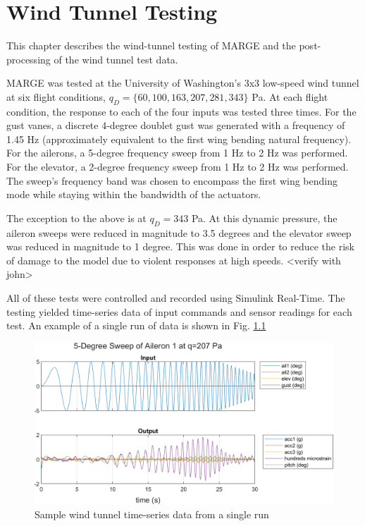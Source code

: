 \chapter{Wind Tunnel Testing}
\label{ch:windTunnel}
\label{sec:wtDAQ}

This chapter describes the wind-tunnel testing of MARGE and the post-processing of the wind tunnel test data.

MARGE was tested at the University of Washington's 3x3 low-speed wind tunnel at six flight conditions, $q_D=\{60,100,163,207,281,343\}$ Pa. At each flight condition, the response to each of the four inputs was tested three times. For the gust vanes, a discrete 4-degree doublet gust was generated with a frequency of 1.45 Hz (approximately equivalent to the first wing bending natural frequency). For the ailerons, a 5-degree frequency sweep from 1 Hz to 2 Hz was performed. For the elevator, a 2-degree frequency sweep from 1 Hz to 2 Hz was performed. The sweep's frequency band was chosen to encompass the first wing bending mode while staying within the bandwidth of the actuators.

The exception to the above is at $q_D=343$ Pa. At this dynamic pressure, the aileron sweeps were reduced in magnitude to 3.5 degrees and the elevator sweep was reduced in magnitude to 1 degree. This was done in order to reduce the risk of damage to the model due to violent responses at high speeds. <verify with john>

All of these tests were controlled and recorded using Simulink Real-Time. The testing yielded time-series data of input commands and sensor readings for each test. An example of a single run of data is shown in Fig. \ref{fig:sampleWT}
\begin{figure}[H]
	\centering
	\includegraphics[width=6in]{figs/sampleWT.png}
	\caption{Sample wind tunnel time-series data from a single run}
	\label{fig:sampleWT}
\end{figure}

